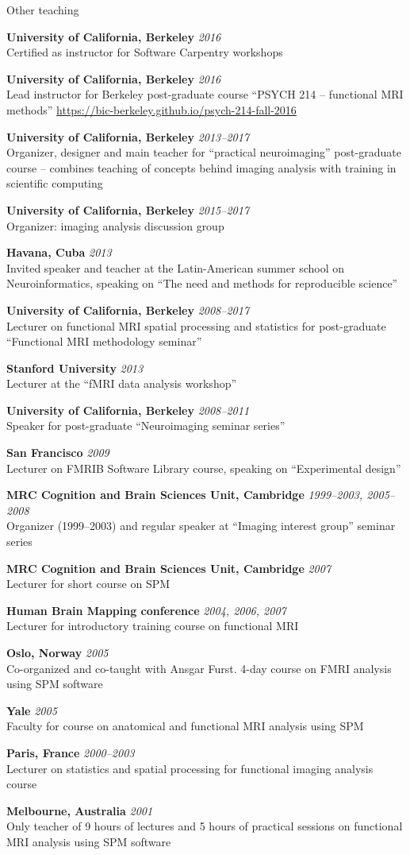 \documentclass{cv}
\newcommand{\PlaceDateNote}[3]{{\bf #1} \hfill {\em #2} \\#3}
\newcommand{\UCB}{University of California, Berkeley}
\newcommand{\CBU}{MRC Cognition and Brain Sciences Unit, Cambridge}
\begin{document}
\begin{cvSection}{Other teaching}

\PlaceDateNote{\UCB}{2016}
    {Certified as instructor for Software Carpentry workshops}

\PlaceDateNote{\UCB}{2016}
{Lead instructor for Berkeley post-graduate course ``PSYCH 214 -- functional
MRI methods'' \url{https://bic-berkeley.github.io/psych-214-fall-2016}}

\PlaceDateNote{\UCB}{2013--2017}
{Organizer, designer and main teacher for ``practical neuroimaging''
post-graduate course -- combines teaching of concepts behind imaging analysis
with training in scientific computing}

\PlaceDateNote{\UCB}{2015--2017}
{Organizer: imaging analysis discussion group}

\PlaceDateNote{Havana, Cuba}{2013}
{Invited speaker and teacher at the Latin-American summer school on
Neuroinformatics, speaking on ``The need and methods for reproducible
science''}

\PlaceDateNote{\UCB}{2008--2017}
{Lecturer on functional MRI spatial processing and statistics for
post-graduate ``Functional MRI methodology seminar''}

\PlaceDateNote{Stanford University}{2013}
{Lecturer at the ``fMRI data analysis workshop''}

\PlaceDateNote{\UCB}{2008--2011}
{Speaker for post-graduate ``Neuroimaging seminar series''}

\PlaceDateNote{San Francisco}{2009}
{Lecturer on FMRIB Software Library course, speaking on ``Experimental
design''}

\PlaceDateNote{\CBU}{1999--2003, 2005--2008}
{Organizer (1999--2003) and regular speaker at ``Imaging interest group''
seminar series}

\PlaceDateNote{\CBU}{2007}
{Lecturer for short course on SPM}

\PlaceDateNote{Human Brain Mapping conference}{2004, 2006, 2007}
{Lecturer for introductory training course on functional MRI}

\PlaceDateNote{Oslo, Norway}{2005}
{Co-organized and co-taught with Ansgar Furst. 4-day course on FMRI analysis
using SPM software}

\PlaceDateNote{Yale}{2005}
{Faculty for course on anatomical and functional MRI analysis using SPM}

\PlaceDateNote{Paris, France}{2000--2003}
{Lecturer on statistics and spatial processing for functional imaging analysis
course}

\PlaceDateNote{Melbourne, Australia}{2001}
{Only teacher of 9 hours of lectures and 5 hours of practical sessions on
functional MRI analysis using SPM software}

\end{cvSection}
\end{document}
